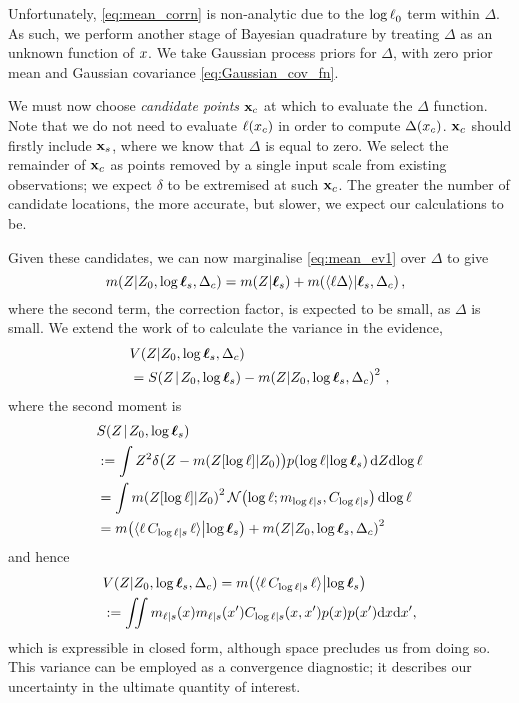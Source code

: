 \documentclass{article}
\begin{document}
Unfortunately, \eqref{eq:mean_corrn} is non-analytic due to the $\tr_0$ term within $\Delta$. As such, we perform another stage of Bayesian quadrature by treating $\Delta$ as an unknown function of $\lfv$. We take Gaussian process priors for $\Delta$, with zero prior mean and Gaussian covariance \eqref{eq:Gaussian_cov_fn}.

 We must now choose \emph{candidate points} $\vlfv_c$ at which to evaluate the $\Delta$ function. 
Note that we do not need to evaluate $\lfn(\lfv_c)$ in order to compute $\Delta(\lfv_c)$.
$\vlfv_c$ should firstly include $\vlfv_s$, where we know that $\Delta$ is equal to zero. We select the remainder of $\vlfv_c$ as points removed by a single input scale from existing observations; we expect $\delta$ to be extremised at such $\vlfv_c$. The greater the number of candidate locations, the more accurate, but slower, we expect our calculations to be.

Given these candidates, we can now marginalise \eqref{eq:mean_ev1} over $\Delta$ to give
\begin{equation} \label{eq:post_mean}
 \hspace{-0.2cm}\mean{\If}{Z_0,\tvr_s,\Delta_c} =
\mean{\If}{\vr_s} + \mean{\inty{\lfn \Delta}}{\vr_s, \Delta_c},
\end{equation}
where the second term, the correction factor, is expected to be small, as $\Delta$ is small. We extend the work of \citet{BQR} to calculate the variance in the evidence,
\begin{align} 
& \cov{\If}{Z_0,\tvr_s,\Delta_c}\nonumber\\ 
& = \secm{\If}{Z_0,\tvr_s} - \mean{\If}{Z_0,\tvr_s,\Delta_c}^2\,,
\end{align}
where the second moment is 
\begin{align}
& \secm{\If}{Z_0,\tvr_s}  \nonumber\\
& \deq \int Z^2 
\delta\bigl(Z - \mean{Z[\tr]}{Z_0}\bigr)
\p{\tr}{\tvr_s}
\ud Z \ud\tr
\nonumber\\
& = \int \mean{Z[\tr]}{Z_0}^2
\N{\tr}{\meancondfn{\tr}{s}}{C_{\tr|s}}
 \ud\tr
\nonumber\\
& = \mean{\inty{\lfn\,C_{\tr|s}\,\lfn}}{\tvr_s}+
\mean{\If}{Z_0,\tvr_s,\Delta_c}^2
\end{align}
and hence 
\begin{align} \label{eq:post_var}
  &\cov{\If}{Z_0,\tvr_s,\Delta_c} = \mean{\inty{\lfn\,C_{\tr|s}\,\lfn}}{\tvr_s} 
\nonumber\\ 
&\deq
 \iint m_{\lfn|s}(\lfv) m_{\lfn|s}(\lfv') C_{\tr|s}(\lfv,\lfv')  p(x) p(x') \ud \lfv \ud\lfv',
\end{align}
which is expressible in closed form, although space precludes us from doing so. This variance can be employed as a convergence diagnostic; it describes our uncertainty in the ultimate quantity of interest.
\end{document}
